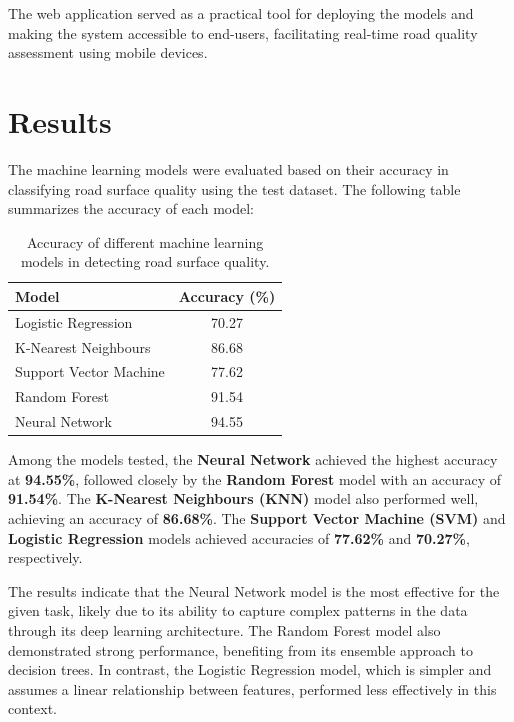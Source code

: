\documentclass[a4paper,12pt]{Classes/RoboticsLaTeX}
\begin{document}
\begin{abstracts}
The web application served as a practical tool for deploying the models and making the system accessible to end-users, facilitating real-time road quality assessment using mobile devices.

	
	\chapter{Results}
	\label{chap:results}
	
	
	
The machine learning models were evaluated based on their accuracy in classifying road surface quality using the test dataset. The following table summarizes the accuracy of each model:

\begin{table}[h]
\centering
\begin{tabular}{|l|c|}
\hline
\textbf{Model} & \textbf{Accuracy (\%)} \\ \hline
Logistic Regression & 70.27 \\ \hline
K-Nearest Neighbours & 86.68 \\ \hline
Support Vector Machine & 77.62 \\ \hline
Random Forest & 91.54 \\ \hline
Neural Network & 94.55 \\ \hline
\end{tabular}
\caption{Accuracy of different machine learning models in detecting road surface quality.}
\label{tab:results}
\end{table}

Among the models tested, the \textbf{Neural Network} achieved the highest accuracy at \textbf{94.55\%}, followed closely by the \textbf{Random Forest} model with an accuracy of \textbf{91.54\%}. The \textbf{K-Nearest Neighbours (KNN)} model also performed well, achieving an accuracy of \textbf{86.68\%}. The \textbf{Support Vector Machine (SVM)} and \textbf{Logistic Regression} models achieved accuracies of \textbf{77.62\%} and \textbf{70.27\%}, respectively.

The results indicate that the Neural Network model is the most effective for the given task, likely due to its ability to capture complex patterns in the data through its deep learning architecture. The Random Forest model also demonstrated strong performance, benefiting from its ensemble approach to decision trees. In contrast, the Logistic Regression model, which is simpler and assumes a linear relationship between features, performed less effectively in this context.


\end{abstracts}
\end{document}
